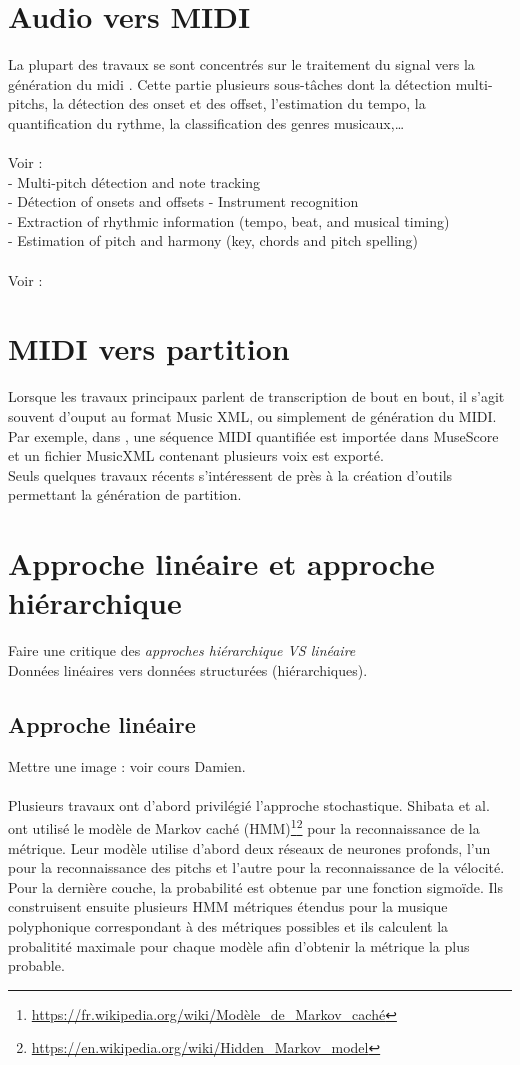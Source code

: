 \section{Audio vers MIDI}
La plupart des travaux se sont concentrés sur le traitement du signal vers la génération du midi \cite{AMT_for_2_Instru}. Cette partie plusieurs sous-tâches dont la détection multi-pitchs, la détection des onset et des offset, l'estimation du tempo, la quantification du rythme, la classification des genres musicaux,…\\\\
Voir : \cite{future_directions}\\
- Multi-pitch détection and note tracking\\
- Détection of onsets and offsets
- Instrument recognition\\
- Extraction of rhythmic information (tempo, beat, and musical timing)\\
- Estimation of pitch and harmony (key, chords and pitch spelling)\\\\
Voir : \cite{Review_ADT} 
\section{MIDI vers partition}
Lorsque les travaux principaux parlent de transcription de bout en bout, il s’agit souvent d’ouput au format Music XML, ou simplement de génération du MIDI. Par exemple, dans \cite{SHIBATA2021262}, une séquence MIDI quantifiée est importée dans MuseScore et un fichier MusicXML contenant plusieurs voix est exporté.\\
Seuls quelques travaux récents \cite{foscarin:hal-01988990} s’intéressent de près à la création d’outils permettant la génération de partition.
\section{Approche linéaire et approche hiérarchique}
Faire une critique des \textit{approches hiérarchique VS linéaire}\\
Données linéaires vers données structurées (hiérarchiques).
\subsection*{Approche linéaire}
Mettre une image : voir cours Damien.\\\\
Plusieurs travaux ont d’abord privilégié l’approche stochastique. Shibata et al.\cite{SHIBATA2021262} ont utilisé le modèle de Markov caché (HMM)\footnote{\url{https://fr.wikipedia.org/wiki/Modèle_de_Markov_caché}}\footnote{\url{https://en.wikipedia.org/wiki/Hidden_Markov_model}} pour la reconnaissance de la métrique. Leur modèle utilise d’abord deux réseaux de neurones profonds, l’un pour la reconnaissance des pitchs et l’autre pour la reconnaissance de la vélocité. Pour la dernière couche, la probabilité est obtenue par une fonction sigmoïde. Ils construisent ensuite plusieurs HMM métriques étendus pour la musique polyphonique correspondant à des métriques possibles et ils calculent la probalitité maximale pour chaque modèle afin d’obtenir la métrique la plus probable.\\
